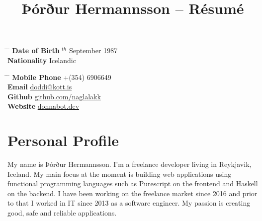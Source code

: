 \documentclass[10pt]{article} %
\begin{document}

\title{Þórður Hermannsson -- Résumé} %


\parbox{0.5\textwidth}{ %
\begin{tabbing} %
\hspace{3cm} \= \hspace{4cm} \= \kill %
{\bf Date of Birth} $^{th}$ September 1987\\ %
{\bf Nationality} \> Icelandic %
\end{tabbing}}
\hfill %
\parbox{0.5\textwidth}{ %
\begin{tabbing} %
\hspace{3cm} \= \hspace{4cm} \= \kill %
{\bf Mobile Phone} \> +(354) 6906649 \\ %
{\bf Email} \> \href{mailto:doddi@kott.is}{doddi@kott.is} \\ %
{\bf Github} \> \href{https://github.com/naglalakk}{github.com/naglalakk} \\ %
{\bf Website} \> \href{https://donnabot.dev}{donnabot.dev} \\
\end{tabbing}}


\section{Personal Profile}

My name is Þórður Hermannsson. I'm a freelance developer living in Reykjavik, Iceland.
My main focus at the moment is building web applications using functional programming languages
such as Purescript on the frontend and Haskell on the backend. 
I have been working on the freelance market since 2016 and prior to that I worked
in IT since 2013 as a software engineer. 
My passion is creating good, safe and reliable applications.
\end{document}
